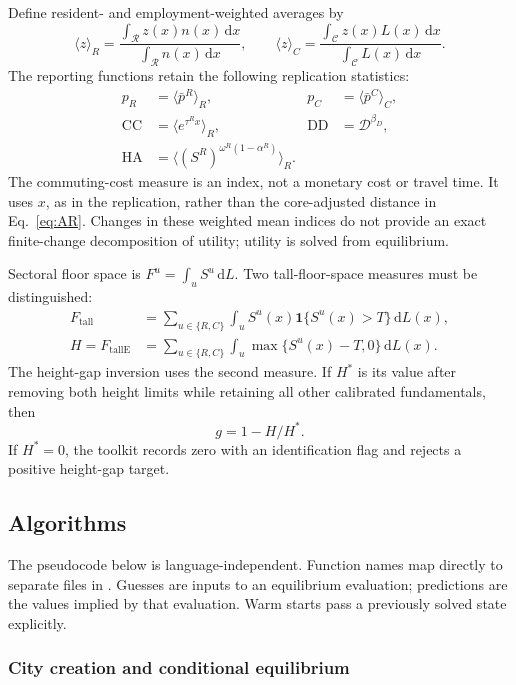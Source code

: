 \documentclass[11pt,a4paper]{article}
\newcommand{\code}[1]{\texttt{\detokenize{#1}}}
\newcommand{\dens}{\mathcal D}
\newcommand{\dd}{\,\mathrm d}
\newcommand{\Rset}{\mathcal R}
\newcommand{\Cset}{\mathcal C}
\begin{document}
Define resident- and employment-weighted averages by
\begin{equation}
 \langle z\rangle_R=\frac{\int_{\Rset}z(x)n(x)\dd x}{\int_{\Rset}n(x)\dd x},
 \qquad
 \langle z\rangle_C=\frac{\int_{\Cset}z(x)L(x)\dd x}{\int_{\Cset}L(x)\dd x}.
 \label{eq:weights}
\end{equation}
The reporting functions retain the following replication statistics:
\begin{align}
 p_R&=\langle\bar p^R\rangle_R, & p_C&=\langle\bar p^C\rangle_C,\label{eq:meanrent}\\
 \mathrm{CC}&=\langle e^{\tau^R x}\rangle_R, &
 \mathrm{DD}&=\dens^{\beta_D},\label{eq:indices}\\
 \mathrm{HA}&=\langle (S^R)^{\omega^R(1-\alpha^R)}\rangle_R.\label{eq:HA}
\end{align}
The commuting-cost measure is an index, not a monetary cost or travel time. It uses $x$, as in the replication, rather than the core-adjusted distance in Eq.~\eqref{eq:AR}. Changes in these weighted mean indices do not provide an exact finite-change decomposition of utility; utility is solved from equilibrium.

Sectoral floor space is $F^u=\int_u S^u\dd L$. Two tall-floor-space measures must be distinguished:
\begin{align}
 F_{\mathrm{tall}}&=\sum_{u\in\{R,C\}}\int_u S^u(x)\mathbf1\{S^u(x)>T\}\dd L(x),\\
 H=F_{\mathrm{tallE}}&=\sum_{u\in\{R,C\}}\int_u\max\{S^u(x)-T,0\}\dd L(x).
 \label{eq:tall}
\end{align}
The height-gap inversion uses the second measure. If $H^*$ is its value after removing both height limits while retaining all other calibrated fundamentals, then
\begin{equation}
 g=1-H/H^*.\label{eq:gap}
\end{equation}
If $H^*=0$, the toolkit records zero with an identification flag and rejects a positive height-gap target.
\clearpage
\subsection{Algorithms}
The pseudocode below is language-independent. Function names map directly to separate files in \code{MATLAB/functions}. Guesses are inputs to an equilibrium evaluation; predictions are the values implied by that evaluation. Warm starts pass a previously solved state explicitly.
\subsubsection{City creation and conditional equilibrium}
\end{document}

